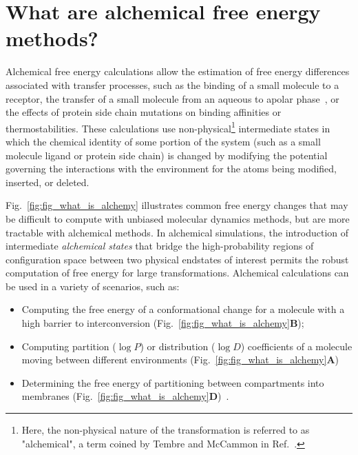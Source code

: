 \documentclass[9pt,bestpractices]{livecoms}
\begin{document}

\section{What are alchemical free energy methods?}
\label{sec:intro}
Alchemical free energy calculations allow the estimation of free energy differences associated with transfer processes, such as the binding of a small molecule to a receptor, the transfer of a small molecule from an aqueous to apolar phase~\cite{zwanzig1954hightemperature}, or the effects of protein side chain mutations on binding affinities or thermostabilities. 
 These calculations use non-physical\footnote{Here, the non-physical nature of the transformation is referred to as "alchemical", a term coined by Tembre and McCammon in Ref.~\cite{tembre1984ligandreceptor}.} intermediate states in which the chemical identity of some portion of the system (such as a small molecule ligand or protein side chain) is changed by modifying the potential governing the interactions with the environment for the atoms being modified, inserted, or deleted. 

Fig.~\ref{fig:fig_what_is_alchemy} illustrates common free energy changes that may be difficult to compute with unbiased molecular dynamics methods, but are more tractable with alchemical methods.
In alchemical simulations, the introduction of intermediate \textit{alchemical states} that bridge the high-probability regions of configuration space between two physical endstates of interest permits the robust computation of free energy for large transformations.
Alchemical calculations can be used in a variety of scenarios, such as: 
\begin{itemize}
\item Computing the free energy of a conformational change for a molecule with a high barrier to interconversion (Fig.~\ref{fig:fig_what_is_alchemy}\textbf{B});
\item Computing partition ($\log P$) or distribution ($\log D$) coefficients of a molecule moving between different environments (Fig.~\ref{fig:fig_what_is_alchemy}\textbf{A})~\cite{rustenburg2016measuring, bosisio2016blinded} 
\item Determining the free energy of partitioning between compartments into membranes (Fig.~\ref{fig:fig_what_is_alchemy}\textbf{D})~\cite{corey2019insights}. 
\end{itemize}
\end{document}
